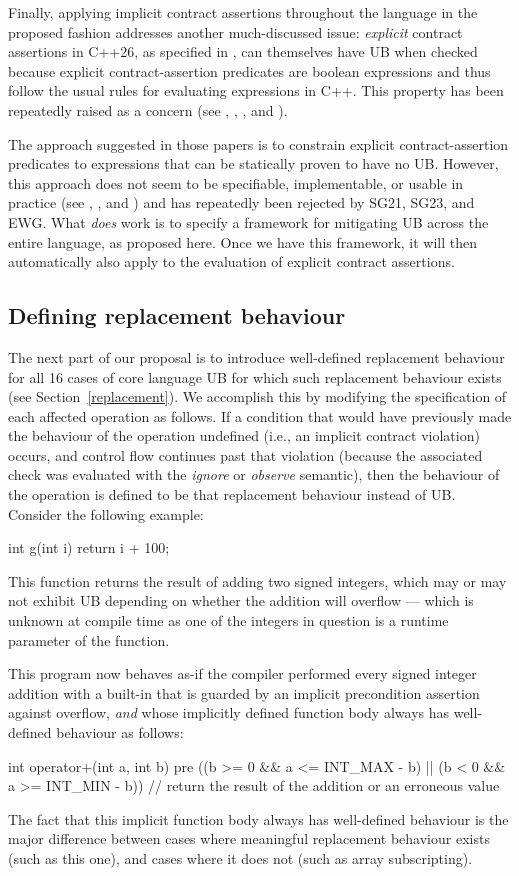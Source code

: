 {Finally, applying implicit contract assertions throughout the language in the proposed fashion addresses another much-discussed issue: \emph{explicit} contract assertions in C++26, as specified in \cite{P2900R14}, can themselves have UB when checked because explicit contract-assertion predicates are boolean expressions and thus follow the usual rules for evaluating expressions in C++. This property has been repeatedly raised as a concern (see \cite{P2680R1}, \cite{P3173R0}, \cite{P3285R0}, and \cite{P3362R0}).

The approach suggested in those papers is to constrain explicit contract-assertion predicates to expressions that can be statically proven to have no UB. However, this approach does not seem to be specifiable, implementable, or usable in practice (see  \cite{P3376R0}, \cite{P3386R0}, and \cite{P3499R1}) and has repeatedly been rejected by SG21, SG23, and EWG. What \emph{does} work is to specify a framework for mitigating UB across the entire language, as proposed here. Once we have this framework, it will then automatically also apply to the evaluation of explicit contract assertions.

\subsection{Defining replacement behaviour}
\label{specifyeb}
The next part of our proposal is to introduce well-defined replacement behaviour for all 16 cases of core language UB for which such replacement behaviour exists (see Section~\ref{replacement}). We accomplish this by modifying the specification of each affected operation as follows. If a condition that would have previously made the behaviour of the operation undefined (i.e., an implicit contract violation) occurs, and control flow continues past that violation (because the associated check was evaluated with the \emph{ignore} or \emph{observe} semantic), then the behaviour of the operation is defined to be that replacement behaviour instead of UB. Consider the following example:
\begin{codeblock}
int g(int i) {
  return i + 100;
}
\end{codeblock}
This function returns the result of adding two signed integers, which may or may not exhibit UB depending on whether the addition will overflow --- which is unknown at compile time as one of the integers in question is a runtime parameter of the function.

This program now behaves as-if the compiler performed every signed integer addition with a built-in  that is guarded by an implicit precondition assertion against overflow, \emph{and} whose implicitly defined function body always has well-defined behaviour as follows:
\begin{codeblock}
int operator+(int a, int b)
pre ((b >= 0 && a <= INT_MAX - b) || (b < 0 && a >= INT_MIN - b)) {  
  // return the result of the addition or an erroneous value
}
\end{codeblock}
The fact that this implicit function body always has well-defined behaviour is the major difference between cases where meaningful replacement behaviour exists (such as this one), and cases where it does not (such as array subscripting).

}
